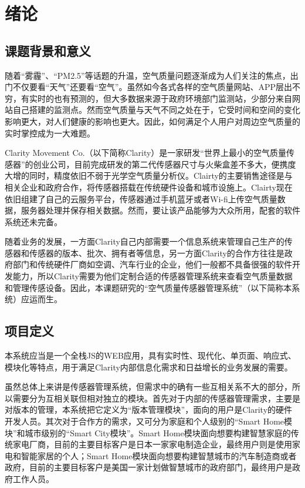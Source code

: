 
\chapter{绪论}
\label{chap:intro}
\section{课题背景和意义}
随着“雾霾”、“PM2.5”等话题的升温，空气质量问题逐渐成为人们关注的焦点，出门不仅要看“天气”还要看“空气”。虽然如今各式各样的空气质量网站、APP层出不穷，有实时的也有预测的，但大多数据来源于政府环境部门监测站，少部分来自网站自己搭建的监测点。然而空气质量与天气不同之处在于，它受时间和空间的变化影响更大，对人们健康的影响也更大。因此，如何满足个人用户对周边空气质量的实时掌控成为一大难题。

Clarity Movement Co.（以下简称Clarity）是一家研发“世界上最小的空气质量传感器”的创业公司，目前完成研发的第二代传感器尺寸与火柴盒差不多大，便携度大增的同时，精度依旧不弱于光学空气质量分析仪。Clairty的主要销售途径是与相关企业和政府合作，将传感器搭载在传统硬件设备和城市设施上。Clairty现在依旧组建了自己的云服务平台，传感器通过手机蓝牙或者Wi-fi上传空气质量数据，服务器处理并保存相关数据。然而，要让该产品能够为大众所用，配套的软件系统还未完备。

随着业务的发展，一方面Clarity自己内部需要一个信息系统来管理自己生产的传感器和传感器的版本、批次、拥有者等信息，另一方面Clarity的合作方往往是政府部门和传统硬件厂商如空调、汽车行业的企业，他们一般都不具备很强的软件开发能力，所以Clarity需要为他们定制合适的传感器管理系统来查看空气质量数据和管理传感设备。因此，本课题研究的“空气质量传感器管理系统”（以下简称本系统）应运而生。

\section{项目定义}
本系统应当是一个全栈JS的WEB应用，具有实时性、现代化、单页面、响应式、模块化等特点，用于满足Clarity内部信息化需求和日益增长的业务发展的需要。

虽然总体上来讲是传感器管理系统，但需求中的确有一些互相关系不大的部分，所以需要分为互相关联但相对独立的模块。首先对于内部的传感器管理需求，主要是对版本的管理，本系统把它定义为“版本管理模块”，面向的用户是Clarity的硬件开发人员。其次对于合作方的需求，又可分为家庭和个人级别的“Smart Home模块”和城市级别的“Smart City模块”。Smart Home模块面向想要构建智慧家庭的传统家电厂商，目前的主要目标客户是日本一家家电制造企业，最终用户则是使用家电和智能家居的个人；Smart Home模块面向想要构建智慧城市的汽车制造商或者政府，目前的主要目标客户是美国一家计划做智慧城市的政府部门，最终用户是政府工作人员。

